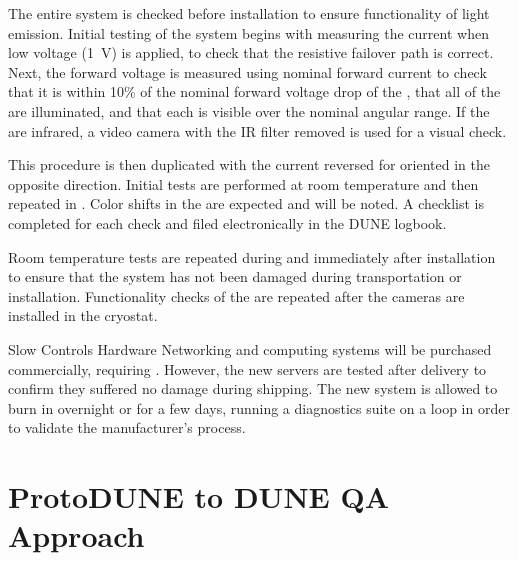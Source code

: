 The entire  system is checked before installation to ensure
functionality of light emission. Initial testing of the system begins
with measuring the current when low voltage (1~V) is applied, to check
that the resistive  failover path is correct. Next, the
forward voltage is measured using nominal forward current to check
that it is within 10\% of the nominal forward voltage drop of the
, that all of the  are illuminated, and that
each  is visible over the nominal angular range. If the
 are infrared, a video camera with the IR filter removed
is used for a visual check.


This procedure is then duplicated with the current reversed for
 oriented in the opposite direction. Initial tests are
performed at room temperature and then repeated in . Color
shifts in the  are expected and will be noted. A checklist
is completed for each  check and filed electronically in the
DUNE logbook.

Room temperature tests are repeated during and immediately after
installation to ensure that the system has not been damaged during
transportation or installation. Functionality checks of the
 are repeated after the cameras are installed in the
cryostat.

Slow Controls Hardware Networking and computing systems will be
purchased commercially, requiring . However, the new servers
are tested after delivery to confirm they suffered no damage during
shipping. The new system is allowed to burn in overnight or for a few
days, running a diagnostics suite on a loop in order to validate the
manufacturer’s  process.


\section{ProtoDUNE to DUNE QA Approach}

